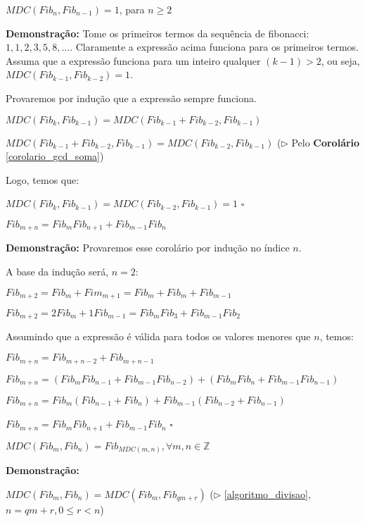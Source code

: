 \begin{proposition}\label{gcd_consecutivo_fib}
$MDC(Fib_n, Fib_{n-1}) = 1$, para $n \geq 2$
\end{proposition}
\textbf{Demonstração:}
Tome os primeiros termos da sequência de fibonacci: $1, 1, 2, 3, 5, 8,...$.
Claramente a expressão acima funciona para os primeiros termos.
Assuma que a expressão funciona para um inteiro qualquer $(k-1) > 2$, ou seja, $MDC(Fib_{k-1}, Fib_{k-2}) = 1$.

Provaremos por indução que a expressão sempre funciona.

$MDC(Fib_{k}, Fib_{k-1}) = MDC(Fib_{k-1} + Fib_{k-2}, Fib_{k-1})$

$MDC(Fib_{k-1} + Fib_{k-2}, Fib_{k-1}) = MDC(Fib_{k-2}, Fib_{k-1})$ ($\triangleright$ Pelo \textbf{Corolário} \autoref{corolario_gcd_soma})

Logo, temos que:

$MDC(Fib_{k}, Fib_{k-1}) = MDC(Fib_{k-2}, Fib_{k-1}) = 1$ $\square$



\begin{proposition}\label{gcd_combinacao_fib}
$Fib_{m+n} = Fib_mFib_{n+1} + Fib_{m-1}Fib_n$
\end{proposition}
\textbf{Demonstração:} Provaremos esse corolário por indução no índice $n$.

A base da indução será, $n=2$:

$Fib_{m+2} = Fib_m + Fim_{m+1} = Fib_m + Fib_m + Fib_{m-1}$

$Fib_{m+2} = 2Fib_m + 1Fib_{m-1} = Fib_mFib_{3} + Fib_{m-1}Fib_2$

Assumindo que a expressão é válida para todos os valores menores que $n$, temos:

$Fib_{m+n} = Fib_{m+n-2} + Fib_{m+n-1}$

$Fib_{m+n} = (Fib_{m}Fib_{n-1} + Fib_{m-1}Fib_{n-2}) + (Fib_{m}Fib_{n} + Fib_{m-1}Fib_{n-1})$

$Fib_{m+n} = Fib_m(Fib_{n-1} + Fib_{n}) + Fib_{m-1}(Fib_{n-2} + Fib_{n-1})$

$Fib_{m+n} = Fib_mFib_{n+1} + Fib_{m-1}Fib_n$ $\square$ 


\begin{theorem}\label{fibonacci_mdc}
$MDC(Fib_m, Fib_n) = Fib_{MDC(m, n)}, \forall m, n \in \mathbb{Z}$
\end{theorem}
\textbf{Demonstração:}

$MDC(Fib_m, Fib_n) = MDC(Fib_m, Fib_{qm + r})$ ($\triangleright$ \autoref{algoritmo_divisao}, $n = qm + r, 0 \leq r < n$)

